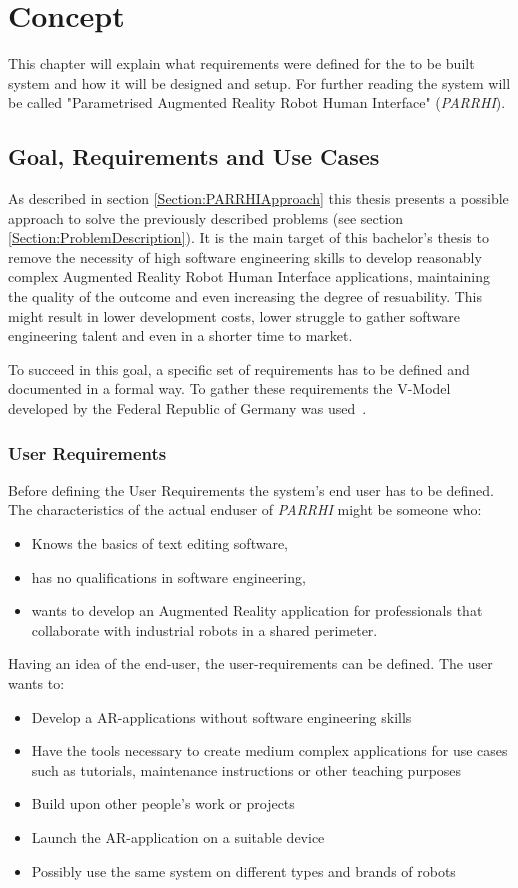 \chapter{Concept}\label{Chap:Concept}

This chapter will explain what requirements were defined for the to be built system and how it will be designed and setup. For further reading the system will be called "Parametrised Augmented Reality Robot Human Interface" (\textit{PARRHI}).

\section{Goal, Requirements and Use Cases}
As described in section \ref{Section:PARRHIApproach} this thesis presents a possible approach to solve the previously described problems (see section \ref{Section:ProblemDescription}). It is the main target of this bachelor's thesis to remove the necessity of high software engineering skills to develop reasonably complex Augmented Reality Robot Human Interface applications, maintaining the quality of the outcome and even increasing the degree of resuability. This might result in lower development costs, lower struggle to gather software engineering talent and even in a shorter time to market.

To succeed in this goal, a specific set of requirements has to be defined and documented in a formal way. To gather these requirements the V-Model developed by the Federal Republic of Germany was used~\cite{vmodell}.

\subsection{User Requirements}
Before defining the User Requirements the system's end user has to be defined. The characteristics of the actual enduser of \textit{PARRHI} might be someone who:
\begin{itemize}
	\setlength\itemsep{-1em}
	\item Knows the basics of text editing software,
	\item has no qualifications in software engineering,
	\item wants to develop an Augmented Reality application for professionals that collaborate with industrial robots in a shared perimeter.
\end{itemize}

Having an idea of the end-user, the user-requirements can be defined. The user wants to:
\begin{itemize}
	\setlength\itemsep{-1em}
	\item Develop a AR-applications without software engineering skills
	\item Have the tools necessary to create medium complex applications for use cases such as tutorials, maintenance instructions or other teaching purposes
	\item Build upon other people's work or projects
	\item Launch the AR-application on a suitable device
	\item Possibly use the same system on different types and brands of robots
\end{itemize}

